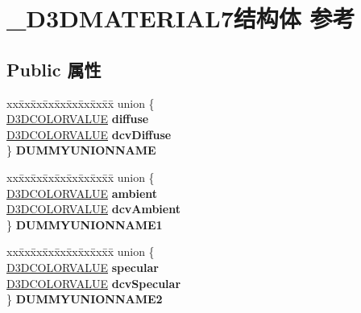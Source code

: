 \hypertarget{struct___d3_d_m_a_t_e_r_i_a_l7}{}\section{\+\_\+\+D3\+D\+M\+A\+T\+E\+R\+I\+A\+L7结构体 参考}
\label{struct___d3_d_m_a_t_e_r_i_a_l7}
\subsection*{Public 属性}
\begin{DoxyCompactItemize}
\item 
\mbox{\label{struct___d3_d_m_a_t_e_r_i_a_l7_a9bdf29170412aa5e391ee73e70214a1a}} 
\begin{tabbing}
xx\=xx\=xx\=xx\=xx\=xx\=xx\=xx\=xx\=\kill
union \{\\
\>\hyperlink{struct___d3_d_c_o_l_o_r_v_a_l_u_e}{D3DCOLORVALUE} {\bfseries diffuse}\\
\>\hyperlink{struct___d3_d_c_o_l_o_r_v_a_l_u_e}{D3DCOLORVALUE} {\bfseries dcvDiffuse}\\
\} {\bfseries DUMMYUNIONNAME}\\

\end{tabbing}\item 
\mbox{\label{struct___d3_d_m_a_t_e_r_i_a_l7_a2144ebc60b690952b304cd8b9ed807d7}} 
\begin{tabbing}
xx\=xx\=xx\=xx\=xx\=xx\=xx\=xx\=xx\=\kill
union \{\\
\>\hyperlink{struct___d3_d_c_o_l_o_r_v_a_l_u_e}{D3DCOLORVALUE} {\bfseries ambient}\\
\>\hyperlink{struct___d3_d_c_o_l_o_r_v_a_l_u_e}{D3DCOLORVALUE} {\bfseries dcvAmbient}\\
\} {\bfseries DUMMYUNIONNAME1}\\

\end{tabbing}\item 
\mbox{\label{struct___d3_d_m_a_t_e_r_i_a_l7_a81d0a4a2b804e6a7b4cc73a84a47c6e2}} 
\begin{tabbing}
xx\=xx\=xx\=xx\=xx\=xx\=xx\=xx\=xx\=\kill
union \{\\
\>\hyperlink{struct___d3_d_c_o_l_o_r_v_a_l_u_e}{D3DCOLORVALUE} {\bfseries specular}\\
\>\hyperlink{struct___d3_d_c_o_l_o_r_v_a_l_u_e}{D3DCOLORVALUE} {\bfseries dcvSpecular}\\
\} {\bfseries DUMMYUNIONNAME2}\\


\end{tabbing}
\end{DoxyCompactItemize}
